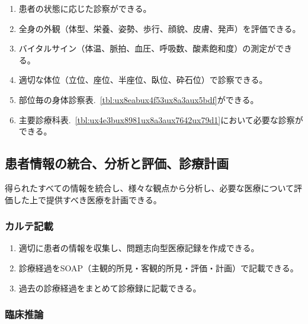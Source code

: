 \begin{enumerate}
\def\labelenumi{\arabic{enumi}.}
\tightlist
\item
  患者の状態に応じた診察ができる。
\item
  全身の外観（体型、栄養、姿勢、歩行、顔貌、皮膚、発声）を評価できる。
\item
  バイタルサイン（体温、脈拍、血圧、呼吸数、酸素飽和度）の測定ができる。
\item
  適切な体位（立位、座位、半座位、臥位、砕石位）で診察できる。
\item
  部位毎の身体診察表.~\ref{tbl:ux8eabux4f53ux8a3aux5bdf}ができる。
\item
  主要診療科表.~\ref{tbl:ux4e3bux8981ux8a3aux7642ux79d1}において必要な診察ができる。
\end{enumerate}

\hypertarget{ux60a3ux8005ux60c5ux5831ux306eux7d71ux5408ux5206ux6790ux3068ux8a55ux4fa1ux8a3aux7642ux8a08ux753b}{%
\subsection{患者情報の統合、分析と評価、診療計画}\label{ux60a3ux8005ux60c5ux5831ux306eux7d71ux5408ux5206ux6790ux3068ux8a55ux4fa1ux8a3aux7642ux8a08ux753b}}

得られたすべての情報を統合し、様々な観点から分析し、必要な医療について評価した上で提供すべき医療を計画できる。

\hypertarget{ux30abux30ebux30c6ux8a18ux8f09}{%
\subsubsection{カルテ記載}\label{ux30abux30ebux30c6ux8a18ux8f09}}

\begin{enumerate}
\def\labelenumi{\arabic{enumi}.}
\tightlist
\item
  適切に患者の情報を収集し、問題志向型医療記録を作成できる。
\item
  診療経過をSOAP（主観的所見・客観的所見・評価・計画）で記載できる。
\item
  過去の診療経過をまとめて診療録に記載できる。
\end{enumerate}

\hypertarget{ux81e8ux5e8aux63a8ux8ad6}{%
\subsubsection{臨床推論}\label{ux81e8ux5e8aux63a8ux8ad6}}

